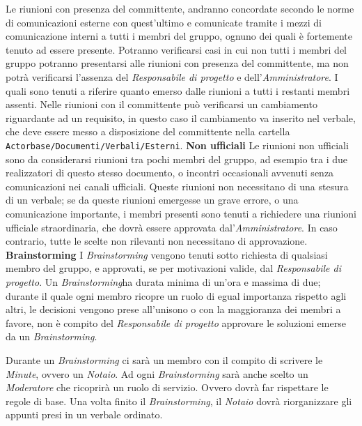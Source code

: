 \documentclass[a4paper]{article}
\begin{document}
		Le riunioni con presenza del committente, andranno concordate secondo le norme di comunicazioni esterne con quest'ultimo
		e comunicate tramite i mezzi di comunicazione interni a tutti i membri del gruppo, ognuno dei quali è fortemente tenuto ad
		essere presente. Potranno verificarsi casi in cui non tutti i membri del gruppo potranno presentarsi alle riunioni con
		presenza del committente, ma non potrà verificarsi l'assenza del \emph{Responsabile di progetto} e dell'\emph{Amministratore}.
		I quali sono tenuti a riferire quanto emerso dalle riunioni a tutti i restanti membri assenti. Nelle riunioni con il
		committente può verificarsi un cambiamento riguardante ad un requisito, in questo caso il cambiamento va inserito nel
		verbale, che deve essere messo a disposizione del committente nella cartella \verb|Actorbase/Documenti/Verbali/Esterni|.
		\textbf{Non ufficiali}
		Le riunioni non ufficiali sono da considerarsi riunioni tra pochi membri del gruppo, ad esempio tra i due realizzatori di questo
		stesso documento, o incontri occasionali avvenuti senza comunicazioni nei canali ufficiali. Queste riunioni non necessitano di
		una stesura di un verbale; se da queste riunioni emergesse un grave errore, o una comunicazione importante, i membri presenti
		sono tenuti a richiedere una riunioni ufficiale straordinaria, che dovrà essere approvata dal'\emph{Amministratore}. In caso
		contrario, tutte le scelte non rilevanti non necessitano di approvazione.
		\textbf{Brainstorming}
		I \emph{Brainstorming} vengono tenuti sotto richiesta di qualsiasi membro del gruppo, e approvati, se per motivazioni
		valide, dal \emph{Responsabile di progetto}. Un \emph{Brainstorming}ha durata minima di un'ora e massima di due; durante il quale
		ogni membro ricopre un ruolo di egual importanza rispetto agli altri, le decisioni vengono prese all'unisono o con la maggioranza
		dei membri a favore, non è compito del \emph{Responsabile di progetto} approvare le soluzioni emerse da un \emph{Brainstorming}.

		Durante un \emph{Brainstorming} ci sarà un membro con il compito di scrivere le \emph{Minute}, ovvero un \emph{Notaio}.
		Ad ogni \emph{Brainstorming} sarà anche scelto un \emph{Moderatore} che ricoprirà un ruolo di servizio. Ovvero dovrà far
		rispettare le regole di base. Una volta finito il \emph{Brainstorming}, il \emph{Notaio} dovrà riorganizzare gli appunti
		presi in un verbale ordinato.

	\cleardoublepage
	\listoffigures

	\cleardoublepage
	\listoftables
\end{document}
